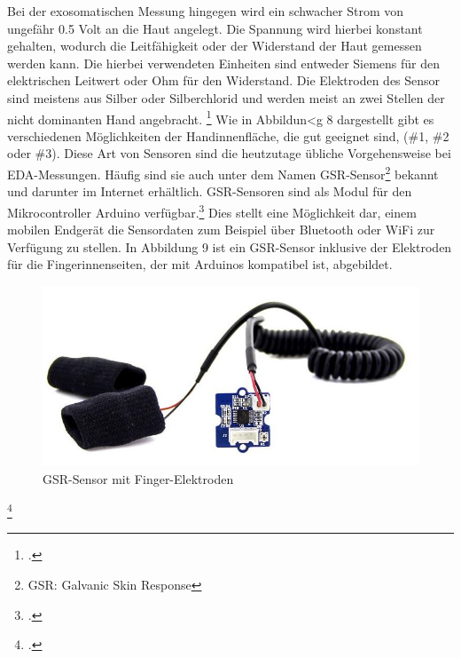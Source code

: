 Bei der exosomatischen Messung hingegen wird ein schwacher Strom von ungefähr 0.5 Volt an die Haut angelegt. Die Spannung wird hierbei konstant gehalten, wodurch die Leitfähigkeit oder der Widerstand der Haut gemessen werden kann. Die hierbei verwendeten Einheiten sind entweder Siemens für den elektrischen Leitwert oder Ohm für den Widerstand. Die Elektroden des Sensor sind meistens aus Silber oder Silberchlorid und werden meist an zwei Stellen der nicht dominanten Hand angebracht. \footcite[Vgl.][Folie 25]{Sch12} Wie in Abbildun<g 8 dargestellt gibt es verschiedenen Möglichkeiten der Handinnenfläche, die gut geeignet sind, (\#1, \#2 oder \#3). \newline
Diese Art von Sensoren sind die heutzutage übliche Vorgehensweise bei EDA-Messungen. Häufig sind sie auch unter dem Namen GSR-Sensor\footnote{GSR: Galvanic Skin Response} bekannt und darunter im Internet erhältlich. GSR-Sensoren sind als Modul für den Mikrocontroller Arduino verfügbar.\footcite[beispielsweise:][]{Gro18} Dies stellt eine Möglichkeit dar, einem mobilen Endgerät die Sensordaten zum Beispiel über Bluetooth oder WiFi zur Verfügung zu stellen. In Abbildung 9 ist ein GSR-Sensor inklusive der Elektroden für die Fingerinnenseiten, der mit Arduinos kompatibel ist, abgebildet.
\begin{figure}[h]
	\centering
	\includegraphics[width=16cm]{Bilder/sensor.jpg}
	\caption[GSR-Sensor mit Finger-Elektroden]{GSR-Sensor mit Finger-Elektroden\footnotemark}
\end{figure}%
\footcitetext{Gro18}
\newline \newline \newline \newline
